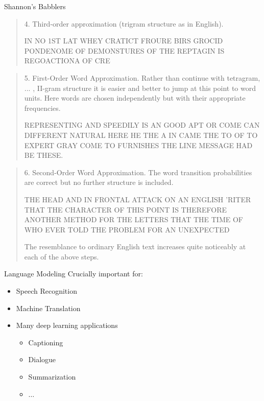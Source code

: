 \documentclass{beamer}
\begin{document}
\begin{frame}[allowframebreaks]{Shannon's Babblers}

  \begin{quote}
   
  4. Third-order approximation (trigram structure as in English).

IN NO 1ST LAT WHEY CRATICT FROURE BIRS GROCID
PONDENOME OF DEMONSTURES OF THE REPTAGIN IS
REGOACTIONA OF CRE
  \end{quote}

  \begin{quote}
5. First-Order Word Approximation. Rather than continue with tetragram,
... , II-gram structure it is easier and better to jump at this
point to word units. Here words are chosen independently but with
their appropriate frequencies.

REPRESENTING AND SPEEDILY IS AN GOOD APT OR
COME CAN DIFFERENT NATURAL HERE HE THE A IN
CAME THE TO OF TO EXPERT GRAY COME TO FURNISHES
THE LINE MESSAGE HAD BE THESE.

  \end{quote}

  \begin{quote}
    6. Second-Order Word Approximation. The word transition probabilities
are correct but no further structure is included.

THE HEAD AND IN FRONTAL ATTACK ON AN ENGLISH
'RITER THAT THE CHARACTER OF THIS POINT IS
THEREFORE ANOTHER METHOD FOR THE LETTERS
THAT THE TIME OF WHO EVER TOLD THE PROBLEM
FOR AN UNEXPECTED

The resemblance to ordinary English text increases quite noticeably at
each of the above steps.

  \end{quote}
\end{frame}



{

}



\begin{frame}{Language Modeling}
  Crucially important for:

  \begin{itemize}
  \item Speech Recognition
  \item Machine Translation
  \item Many deep learning applications
    \begin{itemize}
    \item Captioning
    \item Dialogue
    \item Summarization
    \item $\dots$
    \end{itemize}
  \end{itemize}
\end{frame}
\end{document}
